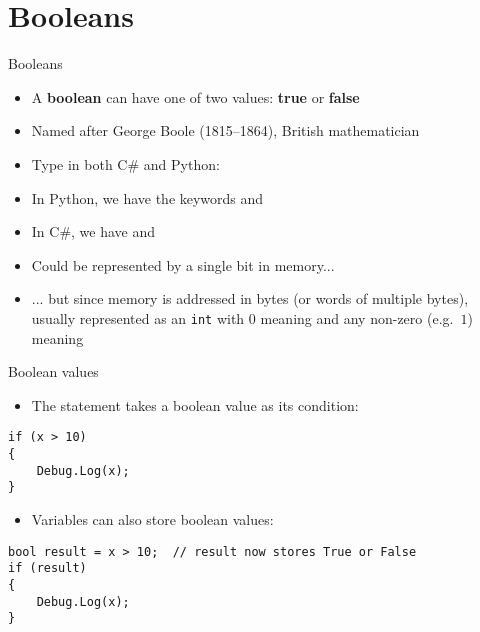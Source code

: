 \part{Booleans}
\frame{\partpage}

\begin{frame}{Booleans}
	\begin{itemize}
		\pause\item A \textbf{boolean} can have one of two values: \textbf{true} or \textbf{false}
		\pause\item Named after George Boole (1815--1864), British mathematician
		\pause\item Type in both C\# and Python: 
		\pause\item In Python, we have the keywords  and 
		\pause\item In C\#, we have  and 
		\pause\item Could be represented by a single bit in memory...
		\pause\item ... but since memory is addressed in bytes (or words of multiple bytes),
			usually represented as an \lstinline{int} with $0$ meaning 
			and any non-zero (e.g.\ $1$) meaning 
	\end{itemize}
\end{frame}

\begin{frame}[fragile]{Boolean values}
	\begin{itemize}
		\pause\item The  statement takes a boolean value as its condition:
	\end{itemize}
	\begin{lstlisting}
if (x > 10)
{
    Debug.Log(x);
}
	\end{lstlisting}
	\begin{itemize}
		\pause\item Variables can also store boolean values:
	\end{itemize}
	\begin{lstlisting}
bool result = x > 10;  // result now stores True or False
if (result)
{
    Debug.Log(x);
}
	\end{lstlisting}
\end{frame}

